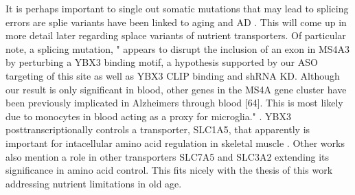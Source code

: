 {It is perhaps important to single out somatic mutations that
may lead to splicing errors are splie variants have been
linked to aging and AD 
\cite{Love_Hayden_Rohn_Alternative_Splicing_Alzheimer_2015}
\cite{Shahnaee_Liu_Ngo_isoform_diversity_splicing_2026}
\cite{Li_Wang_Ma_Alternative_splicing_aging_2017}.
This will come up in more detail later regarding splace variants
of nutrient transporters.
Of particular note, a splicing mutation, " 
appears to disrupt the inclusion of an exon in MS4A3 by perturbing a YBX3 binding motif, a hypothesis supported by our ASO targeting of this site as well as YBX3 CLIP binding and shRNA KD. Although our result is only significant in blood, other genes in the MS4A gene cluster have been previously implicated in Alzheimers through blood [64]. This is most likely due to monocytes in blood acting as a proxy for microglia." \cite{PMC12626415}.
YBX3 posttranscriptionally controls a transporter, SLC1A5, that
apparently is important for intacellular amino acid regulation 
in skeletal muscle \cite{PMC10837625}.
Other works also mention a role in other transporters SLC7A5 and SLC3A2
\cite{Cooke_Schwarzl_Huppertz_Binding_Protein_2019}
extending its significance in amino acid control.
This fits nicely with the thesis of this work addressing nutrient 
limitations in old age. 
}%


